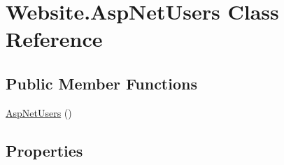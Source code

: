 \hypertarget{class_website_1_1_asp_net_users}{}\section{Website.\+Asp\+Net\+Users Class Reference}
\label{class_website_1_1_asp_net_users}
\subsection*{Public Member Functions}
\begin{DoxyCompactItemize}
\item 
\hyperlink{class_website_1_1_asp_net_users_a3170c53ff33e60f9822a98f64c428966}{Asp\+Net\+Users} ()
\end{DoxyCompactItemize}
\subsection*{Properties}

